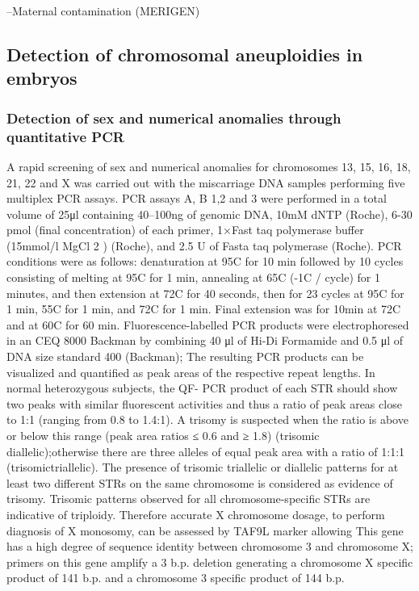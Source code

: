 
--Maternal contamination (MERIGEN) 

\subsection*{Detection of chromosomal aneuploidies in embryos} 
\subsubsection*{Detection of sex and numerical anomalies through quantitative PCR}
A rapid screening of sex and numerical anomalies for chromosomes 13, 15, 16, 18, 21, 22 and X was carried out with the miscarriage DNA samples performing five multiplex PCR assays. PCR assays A, B 1,2 and 3 were performed in a total volume of 25μl containing 40–100ng of genomic DNA, 10mM dNTP (Roche), 6-30 pmol (final concentration) of each primer, 1×Fast taq polymerase buffer (15mmol/l MgCl 2 ) (Roche), and 2.5 U of Fasta taq polymerase (Roche). PCR conditions were as follows: denaturation at 95\textdegree C for 10 min followed by 10 cycles consisting of melting at 95\textdegree C for 1 min, annealing at 65\textdegree C (-1\textdegree C / cycle) for 1 minutes, and then extension at 72\textdegree C for 40 seconds, then for 23 cycles at 95\textdegree C for 1 min, 55\textdegree C for 1 min, and 72\textdegree C for 1 min. Final extension was for 10min at 72\textdegree C and at 60\textdegree C for 60 min. Fluorescence-labelled PCR products were electrophoresed in an CEQ 8000 Backman by combining 40 μl of Hi-Di Formamide and 0.5 μl of DNA size standard 400 (Backman); The resulting PCR products can be visualized and quantified as peak areas of the respective repeat lengths. In normal heterozygous subjects, the QF- PCR product of each STR should show two peaks with similar fluorescent activities and thus a ratio of peak areas close to 1:1 (ranging from 0.8 to 1.4:1). A trisomy is suspected when the ratio is  above or below this range (peak area ratios ≤ 0.6 and ≥ 1.8) (trisomic diallelic);otherwise there are three alleles of equal peak area with a ratio of 1:1:1 (trisomictriallelic). The presence of trisomic triallelic or diallelic patterns for at least two different STRs on the same chromosome is considered as evidence of trisomy. Trisomic patterns observed for all chromosome-specific STRs are indicative of triploidy. Therefore accurate X chromosome dosage, to perform diagnosis of X monosomy, can be assessed by TAF9L marker allowing This gene has a high degree of sequence identity between chromosome 3 and chromosome X; primers on this gene amplify a 3 b.p. deletion generating a chromosome X specific product of 141 b.p. and a chromosome 3 specific product of 144 b.p.

